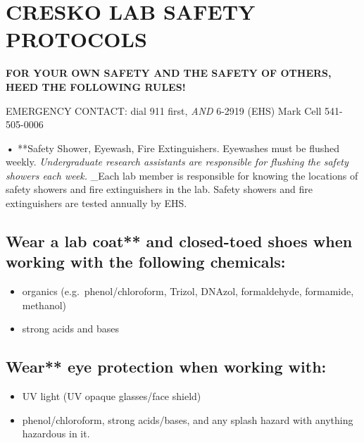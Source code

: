 \documentclass[
]{book}
\begin{document}
\hypertarget{cresko-lab-safety-protocols}{%
\chapter{CRESKO LAB SAFETY PROTOCOLS}\label{cresko-lab-safety-protocols}}

\textbf{FOR YOUR OWN SAFETY AND THE SAFETY OF OTHERS, HEED THE FOLLOWING RULES!}

EMERGENCY CONTACT: dial 911 first, \emph{AND} 6-2919 (EHS) \textbar{} Mark Cell 541-505-0006

\textbf{•} **Safety Shower, Eyewash, Fire Extinguishers. Eyewashes must be flushed weekly. \emph{Undergraduate research assistants are responsible for flushing the safety showers each week.} \_Each lab member is responsible for knowing the locations of safety showers and fire extinguishers in the lab. Safety showers and fire extinguishers are tested annually by EHS.

\hypertarget{wear-a-lab-coat-and-closed-toed-shoes-when-working-with-the-following-chemicals}{%
\section{\texorpdfstring{Wear a lab coat** \textbf{and closed-toed shoes} \textbf{when working with the following chemicals:}}{Wear a lab coat** and closed-toed shoes when working with the following chemicals:}}\label{wear-a-lab-coat-and-closed-toed-shoes-when-working-with-the-following-chemicals}}

\begin{itemize}
\item
  organics (e.g.~phenol/chloroform, Trizol, DNAzol, formaldehyde, formamide, methanol)
\item
  strong acids and bases
\end{itemize}

\hypertarget{wear-eye-protection-when-working-with}{%
\section{\texorpdfstring{Wear** \textbf{eye protection} \textbf{when working with:}}{Wear** eye protection when working with:}}\label{wear-eye-protection-when-working-with}}

\begin{itemize}
\item
  UV light (UV opaque glasses/face shield)
\item
  phenol/chloroform, strong acids/bases, and any splash hazard with anything hazardous in it.
\end{itemize}
\end{document}
